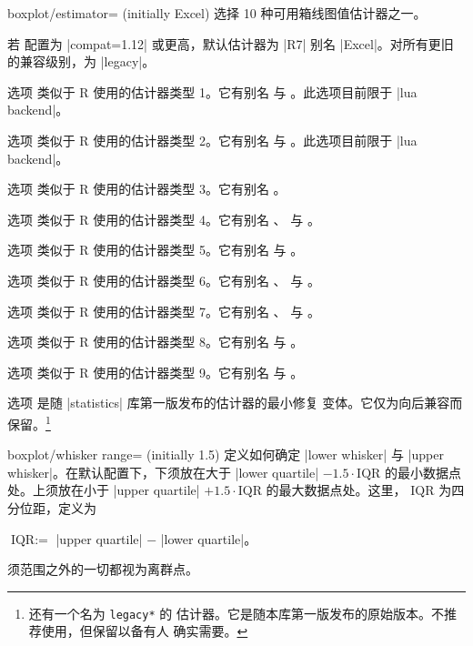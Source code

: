 \begin{pgfplotskey}{boxplot/estimator= (initially Excel)}
    选择 10 种可用箱线图值估计器之一。

    若 \PGFPlots{} 配置为 |compat=1.12| 或更高，默认估计器为 |R7| 别名
    |Excel|。对所有更旧的兼容级别，为 |legacy|。

    选项  类似于 R 使用的估计器类型 1。它有别名
     与 。此选项目前限于
    |lua backend|。

    选项  类似于 R 使用的估计器类型 2。它有别名
     与 。此选项目前限于
    |lua backend|。

    选项  类似于 R 使用的估计器类型 3。它有别名
    。

    选项  类似于 R 使用的估计器类型 4。它有别名
    、 与 。

    选项  类似于 R 使用的估计器类型 5。它有别名
     与 。

    选项  类似于 R 使用的估计器类型 6。它有别名
    、 与 。

    选项  类似于 R 使用的估计器类型 7。它有别名
    、 与 。

    选项  类似于 R 使用的估计器类型 8。它有别名
     与 。

    选项  类似于 R 使用的估计器类型 9。它有别名
     与 。

    选项  是随 |statistics| 库第一版发布的估计器的最小修复
    变体。它仅为向后兼容而保留。\footnote{还有一个名为 \texttt{legacy*} 的
    估计器。它是随本库第一版发布的原始版本。不推荐使用，但保留以备有人
    确实需要。}
\end{pgfplotskey}

\begin{pgfplotskey}{boxplot/whisker range= (initially 1.5)}
    定义如何确定 |lower whisker| 与 |upper whisker|。在默认配置下，下须放在大于
    |lower quartile| $- 1.5 \cdot \text{IQR}$ 的最小数据点处。上须放在小于
    |upper quartile| $+ 1.5 \cdot \text{IQR}$ 的最大数据点处。这里，
    $\text{IQR}$ 为四分位距，定义为

    $\text{IQR} := $ |upper quartile| $-$ |lower quartile|。

    须范围之外的一切都视为离群点。
\end{pgfplotskey}
\endgroup


